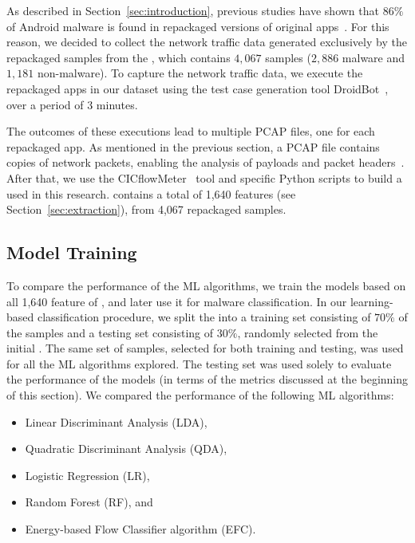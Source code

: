 As described in Section~\ref{sec:introduction}, previous studies have shown that $86\%$ of Android malware is found in repackaged
versions of original apps~\cite{DBLP:journals/tdsc/TianYRTP20,DBLP:conf/sp/ZhouJ12}. For this reason, we decided to collect the network traffic
data generated exclusively by the repackaged samples from the \cds, which contains $4,067$ samples ($2,886$ malware and $1,181$ non-malware).
To capture the network traffic data, we execute the repackaged apps in our dataset using the test case generation tool
DroidBot~\cite{DBLP:conf/icse/LiYGC17}, over a period of $3$ minutes.

The outcomes of these executions lead to multiple PCAP files, one for each repackaged app. As mentioned in the previous
section, a PCAP file contains copies of network packets, enabling the analysis of payloads and packet headers~\cite{DBLP:conf/iv/UhlarHR21}.
After that, we use the CICflowMeter~\cite{DBLP:conf/icissp/LashkariDMG17} tool and specific Python scripts to build a
\fds used in this research. \fds contains a total of 1,640 features (see Section~\ref{sec:extraction}), from 4,067 repackaged samples.

\subsection{Model Training}\label{sec:training}

To compare the performance of the ML algorithms, we train the
models based on all 1,640 feature of \fds, and later use it for malware classification. In our learning-based classification procedure,
we split the \fds into a training set consisting of $70\%$
of the samples and a testing set consisting of $30\%$, randomly
selected from the initial \fds. The same set of samples, selected for both training and testing, was used for all the ML algorithms explored. The testing set was used solely to evaluate the performance of the models (in terms of the metrics discussed at the beginning of this section). We compared the performance of the following ML algorithms:


\begin{itemize}
  \item Linear Discriminant Analysis (LDA),
  \item Quadratic Discriminant Analysis (QDA),
  \item Logistic Regression (LR),
  \item Random Forest (RF), and
  \item Energy-based Flow Classifier algorithm (EFC).
\end{itemize}


